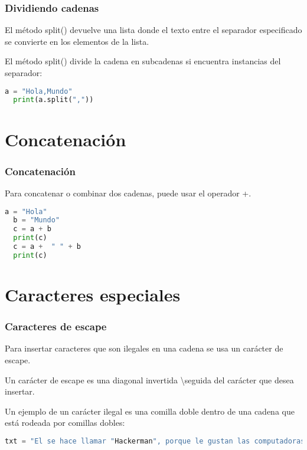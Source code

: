 \begin{frame}[fragile]
  \frametitle{Dividiendo cadenas}

  El método \textcolor{codeKeyword}{split}() devuelve una lista donde
  el texto entre el separador especificado se convierte en los elementos
  de la lista.

  \vspace{\baselineskip}
  El método \textcolor{codeKeyword}{split}() divide la cadena en
  subcadenas si encuentra instancias del separador:
  \begin{lstlisting}[language=Python]
  a = "Hola,Mundo"
  print(a.split(","))
  \end{lstlisting}
\end{frame}


\section{Concatenación}

\begin{frame}[fragile]
  \frametitle{Concatenación}

  Para concatenar o combinar dos cadenas, puede usar el operador +.

  \begin{lstlisting}[language=Python]
  a = "Hola"
  b = "Mundo"
  c = a + b
  print(c)
  c = a +  " " + b
  print(c)
  \end{lstlisting}
\end{frame}


\section{Caracteres especiales}

\begin{frame}[fragile]
  \frametitle{Caracteres de escape}

  Para insertar caracteres que son ilegales en una cadena se
  usa un carácter de escape.

  \vspace{\baselineskip}
  Un carácter de escape es una diagonal invertida \textbackslash seguida del
  carácter que desea insertar.

  \vspace{\baselineskip}
  Un ejemplo de un carácter ilegal es una comilla doble dentro
  de una cadena que está rodeada por comillas dobles: 

  \vspace{\baselineskip}
  \begin{lstlisting}[language=Python]
  txt = "El se hace llamar "Hackerman", porque le gustan las computadoras"
  \end{lstlisting}
\end{frame}

